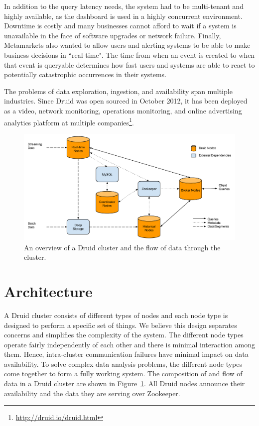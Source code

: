 \documentclass{vldb}
\begin{document}
In addition to the query latency needs, the system had to be multi-tenant and
highly available, as the dashboard is used in a highly concurrent environment.
Downtime is costly and many businesses cannot afford to wait if a system is
unavailable in the face of software upgrades or network failure. Finally,
Metamarkets also wanted to allow users and alerting systems to be able to make
business decisions in ``real-time". The time from when an event is created to
when that event is queryable determines how fast users and systems are able to
react to potentially catastrophic occurrences in their systems. 

The problems of data exploration, ingestion, and availability span multiple
industries. Since Druid was open sourced in October 2012, it has been deployed as a
video, network monitoring, operations monitoring, and online advertising
analytics platform at multiple companies\footnote{\href{http://druid.io/druid.html}{http://druid.io/druid.html}}.

\begin{figure}
\centering
\includegraphics[width = 4.5in]{cluster}
\caption{An overview of a Druid cluster and the flow of data through the cluster.}
\label{fig:cluster}
\end{figure}

\section{Architecture}
A Druid cluster consists of different types of nodes and each node type is
designed to perform a specific set of things. We believe this design separates
concerns and simplifies the complexity of the system. The different node types
operate fairly independently of each other and there is minimal interaction among
them. Hence, intra-cluster communication failures have minimal impact on data
availability.  To solve complex data analysis problems, the different node
types come together to form a fully working system. The composition of and flow
of data in a Druid cluster are shown in Figure~\ref{fig:cluster}. All Druid
nodes announce their availability and the data they are serving over
Zookeeper\cite{hunt2010zookeeper}.
\end{document}
